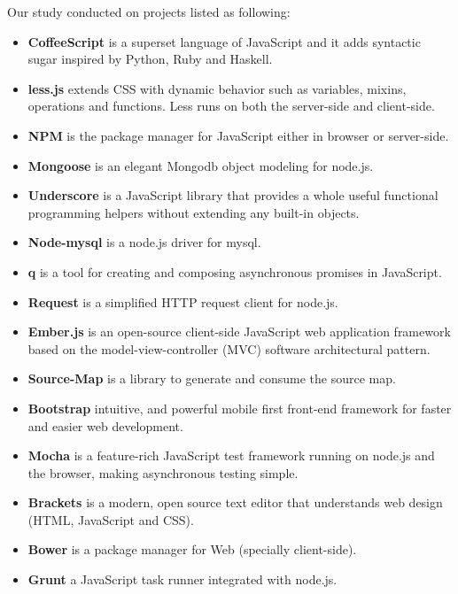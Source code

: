 Our study conducted on projects listed as following:
\begin{itemize}
	\item \textbf{CoffeeScript} is a superset language of JavaScript and it adds syntactic sugar inspired by Python, Ruby and Haskell.
	\item \textbf{less.js} extends CSS with dynamic behavior such as variables, mixins, operations and functions. Less runs on both the server-side and client-side.
	\item \textbf{NPM} is the package manager for JavaScript either in browser or server-side.
	\item \textbf {Mongoose} is an elegant Mongodb object modeling for node.js.
	\item \textbf{Underscore} is a JavaScript library that provides a whole useful functional programming helpers without extending any built-in objects.
	\item \textbf {Node-mysql} is a node.js driver for mysql.
	\item \textbf {q} is a tool for creating and composing asynchronous promises in JavaScript.
	\item \textbf {Request} is a simplified HTTP request client for node.js.
	\item \textbf{Ember.js} is an open-source client-side JavaScript web application framework based on the model-view-controller (MVC) software architectural pattern.
	\item \textbf{Source-Map} is a library to generate and consume the source map.
	\item \textbf{Bootstrap} intuitive, and powerful mobile first front-end framework for faster and easier web development.
	\item \textbf{Mocha} is a feature-rich JavaScript test framework running on node.js and the browser, making asynchronous testing simple.
	\item \textbf{Brackets} is a modern, open source text editor that understands web design (HTML, JavaScript and CSS).
	\item \textbf{Bower} is a package manager for Web (specially client-side).
	\item \textbf{Grunt} a JavaScript task runner integrated with node.js.
\end{itemize} 

